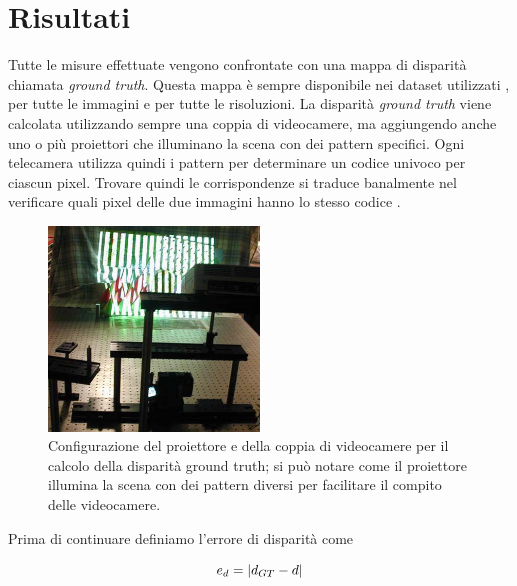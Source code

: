 \documentclass[12pt]{report}
\DeclarePairedDelimiter{\abs}{\lvert}{\rvert}    %
\begin{document}
				

	\chapter{Risultati}
	\label{sec:risultati}
	\pagestyle{fancy}				
	
		Tutte le misure effettuate vengono confrontate con una mappa di disparità chiamata \textit{ground truth}. Questa mappa è sempre disponibile nei dataset utilizzati \cite{dataset_2006_1, dataset_2006_2}, per tutte le immagini e per tutte le risoluzioni. La disparità \textit{ground truth} viene calcolata utilizzando sempre una coppia di videocamere, ma aggiungendo anche uno o più proiettori che illuminano la scena con dei pattern specifici. Ogni telecamera utilizza quindi i pattern per determinare un codice univoco per ciascun pixel. Trovare quindi le corrispondenze si traduce banalmente nel verificare quali pixel delle due immagini hanno lo stesso codice \cite{ground_truth}.  			
		
		\begin{figure}
			\includegraphics[width=0.5\textwidth]{./figures/ground_truth.png}
			\caption{Configurazione del proiettore e della coppia di videocamere per il calcolo della disparità ground truth; si può notare come il proiettore illumina la scena con dei pattern diversi per facilitare il compito delle videocamere.}
			\label{fig:groundtruth}
		\end{figure}
		
		\noindent Prima di continuare definiamo l'errore di disparità come
		
		\begin{equation}
			e_{d}=\abs{d_{GT}-d}
			\label{eq:errore}
		\end{equation} 
		
\end{document}
